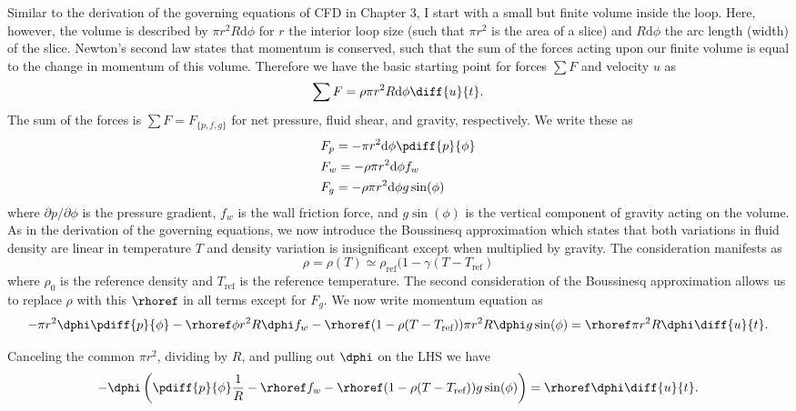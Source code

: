 Similar to the derivation of the governing equations of CFD in Chapter 3, I start with a small but finite volume inside the loop.
Here, however, the volume is described by $\pi r^2 R \text{d} \phi$ for $r$ the interior loop size (such that $\pi r^2$ is the area of a slice) and $R\text{d}\phi$ the arc length (width) of the slice.
Newton's second law states that momentum is conserved, such that the sum of the forces acting upon our finite volume is equal to the change in momentum of this volume.
Therefore we have the basic starting point for forces $\sum F$ and velocity $u$ as
\begin{equation} \sum F = \rho \pi r^2 R \text{d}\phi \diff{u}{t} .\end{equation}
The sum of the forces is $\sum F = F_{\{p,f,g\}}$ for net pressure, fluid shear, and gravity, respectively.
We write these as
\begin{align} & F_p = -\pi r^2 \text{d} \phi \pdiff{p}{\phi}\\
& F_w = -\rho \pi r^2 \text{d} \phi f_w\\
& F_g = -\rho \pi r^2 \text{d} \phi g \sin (\phi)\end{align}
where $\partial p /\partial \phi$ is the pressure gradient, $f_w$ is the wall friction force, and $g \sin (\phi)$ is the vertical component of gravity acting on the volume.
As in the derivation of the governing equations, we now introduce the Boussinesq approximation which states that both variations in fluid density are linear in temperature $T$ and density variation is insignificant except when multiplied by gravity.
The consideration manifests as
\begin{equation*} \rho = \rho (T) \simeq \rho _\text{ref} (1 - \gamma (T - T_\text{ref}) \end{equation*}
where $\rho _0$ is the reference density and $T_\text{ref}$ is the reference temperature.
The second consideration of the Boussinesq approximation allows us to replace $\rho$ with this $\rhoref$ in all terms except for $F_g$.
We now write momentum equation as
\begin{equation} -\pi r^2 \dphi \pdiff{p}{\phi} - \rhoref \phi r^2 R \dphi f_w
- \rhoref (1 - \rho (T- T_\text{ref}) ) \pi r^2 R \dphi g \sin (\phi) = \rhoref \pi r^2 R \dphi \diff{u}{t}. \end{equation}

Canceling the common $\pi r^2$, dividing by $R$, and pulling out $\dphi$ on the LHS we have
\begin{equation} -\dphi \left ( \pdiff{p}{\phi}  \frac{1}{R} - \rhoref f_w - \rhoref (1 - \rho (T- T_\text{ref}) ) g \sin (\phi) \right ) = \rhoref \dphi \diff{u}{t}. \label{eq:EM07} \end{equation}

